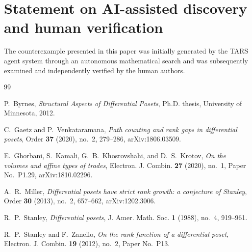 \documentclass[11pt,a4paper]{amsart}
\theoremstyle{definition}
\theoremstyle{remark}
\begin{document}
\section*{Statement on AI-assisted discovery and human verification}
The counterexample presented in this paper was initially generated by the TARS agent system through an autonomous mathematical search and was subsequently examined and independently verified by the human authors.

\begin{thebibliography}{99}

P.~Byrnes,
\emph{Structural Aspects of Differential Posets},
Ph.D. thesis, University of Minnesota, 2012.

C.~Gaetz and P.~Venkataramana,
\emph{Path counting and rank gaps in differential posets},
Order \textbf{37} (2020), no.~2, 279--286,
arXiv:1806.03509.

E.~Ghorbani, S.~Kamali, G.~B.~Khosrovshahi, and D.~S.~Krotov,
\emph{On the volumes and affine types of trades},
Electron. J. Combin. \textbf{27} (2020), no.~1, Paper No.~P1.29,
arXiv:1810.02296.

A.~R.~Miller,
\emph{Differential posets have strict rank growth: a conjecture of Stanley},
Order \textbf{30} (2013), no.~2, 657--662,
arXiv:1202.3006.

R.~P.~Stanley,
\emph{Differential posets},
J. Amer. Math. Soc. \textbf{1} (1988), no.~4, 919--961.

R.~P.~Stanley and F.~Zanello,
\emph{On the rank function of a differential poset},
Electron. J. Combin. \textbf{19} (2012), no.~2, Paper No.~P13.

\end{thebibliography}
\end{document}

